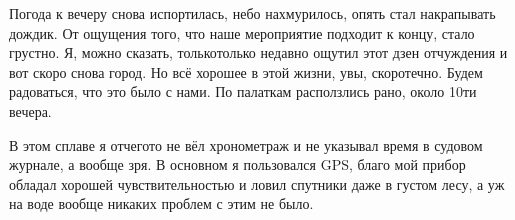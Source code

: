 Погода к вечеру снова испортилась, небо нахмурилось, опять стал накрапывать дождик. От ощущения того, что наше мероприятие подходит к концу, стало грустно. Я, можно сказать, только\sdash только недавно ощутил этот дзен отчуждения и вот скоро снова город. Но всё хорошее в этой жизни, увы, скоротечно. Будем радоваться, что это было с нами. По палаткам расползлись рано, около 10\sdash ти вечера. 

В этом сплаве я отчего\sdash то не вёл хронометраж и не указывал время в судовом журнале, а вообще зря. В основном я пользовался GPS, благо мой прибор обладал хорошей чувствительностью и ловил спутники даже в густом лесу, а уж на воде вообще никаких проблем с этим не было.

\begin{center}
\end{center}
